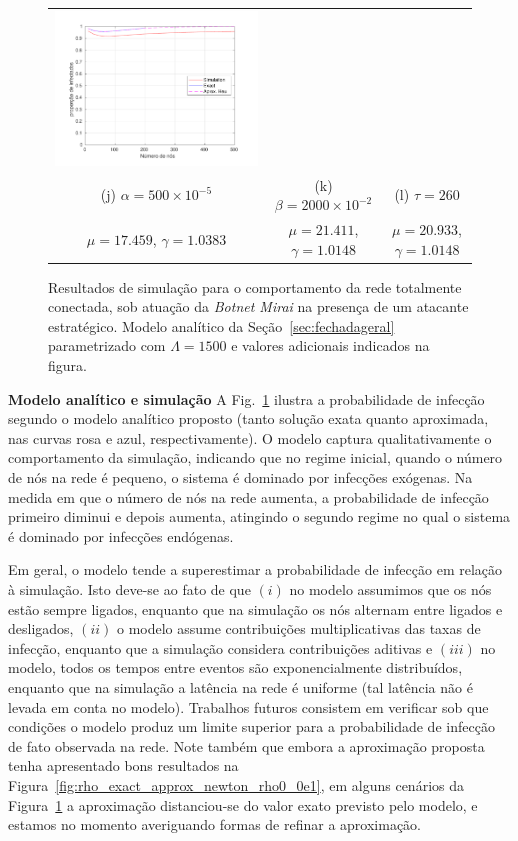 \begin{figure}
\begin{tabular}{ccc}
	        \hspace{-0.6cm}\includegraphics[width=0.35\columnwidth]{img/fig_l_3003_v0_lambda1500_mu2_8819_gamma1_017100_iter_2_rho0_0.pdf}\\
	        (j) $\alpha = 500 \times 10^{-5}$ & 
	        (k) $\beta  = 2000 \times 10^{-2}$ & 
	        (l) $\tau   = 260$ \\
	        $\mu = 17.459$, $\gamma = 1.0383$ &
            $\mu = 21.411$, $\gamma = 1.0148$ &
            $\mu = 20.933$, $\gamma = 1.0148$ 
	    \end{tabular}
	    \caption{Resultados de simulação para o comportamento da rede totalmente conectada, sob atuação da \textit{Botnet Mirai}  na presença de um atacante estratégico.  Modelo analítico da Seção~\ref{sec:fechadageral} parametrizado com $\Lambda = 1500$ e valores adicionais indicados na figura. }
	    \label{fig:simulacao_resultados_1a_parte}
	\end{figure}
	
	
	
		\textbf{Modelo analítico e simulação}  A Fig.~\ref{fig:simulacao_resultados_1a_parte}  ilustra a probabilidade de infecção segundo o modelo analítico proposto (tanto solução exata quanto  aproximada, nas curvas rosa e azul, respectivamente).   O modelo captura qualitativamente o comportamento da simulação, indicando que no regime inicial, quando o número de nós na rede é pequeno, o sistema é dominado por infecções exógenas.  Na medida em que o número de nós na rede aumenta, a probabilidade de infecção primeiro diminui e depois aumenta, atingindo o segundo regime no qual   o sistema é dominado por infecções endógenas.  
		
	Em geral, o modelo tende a superestimar a probabilidade de infecção em relação à simulação.  Isto deve-se ao fato de que $(i)$ no modelo assumimos que os nós estão sempre ligados, enquanto que na simulação os nós alternam entre ligados e desligados,   $(ii)$  o modelo assume contribuições multiplicativas das taxas de infecção, enquanto que a simulação considera contribuições aditivas e $(iii)$  no modelo, todos os tempos entre eventos são exponencialmente distribuídos, enquanto que na simulação a latência na rede é uniforme (tal latência não é levada em conta no modelo).  Trabalhos futuros consistem em verificar sob que condições o modelo  produz um limite superior para a probabilidade de infecção de fato observada na rede.   Note também que embora a aproximação proposta tenha apresentado bons resultados na Figura~\ref{fig:rho_exact_approx_newton_rho0_0e1}, em alguns cenários da Figura~\ref{fig:simulacao_resultados_1a_parte} a aproximação distanciou-se do valor exato previsto pelo modelo, e estamos no momento averiguando formas de refinar a aproximação.  
	
